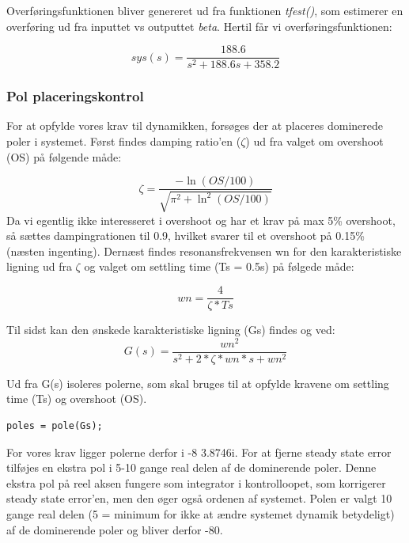 Overføringsfunktionen bliver genereret ud fra funktionen \textit{tfest()}, som estimerer en overføring ud fra inputtet vs outputtet \textit{beta}. Hertil får vi overføringsfunktionen:

\begin{equation}
sys(s) = \frac{188.6}{s^2 + 188.6 s + 358.2}
\end{equation}
    

\subsubsection{Pol placeringskontrol}
For at opfylde vores krav til dynamikken, forsøges der at placeres dominerede poler i systemet. Først findes damping ratio'en ($ \zeta $) ud fra valget om overshoot (OS) på følgende måde: 

\begin{equation}
\zeta = \frac{-\ln(OS/100)}{\sqrt{\pi^2+\ln^2(OS/100)}}
\end{equation} 
Da vi egentlig ikke interesseret i overshoot og har et krav på max 5\% overshoot, så sættes dampingrationen til 0.9, hvilket svarer til et overshoot på 0.15\% (næsten ingenting).
Dernæst findes resonansfrekvensen wn for den karakteristiske ligning ud fra $ \zeta $ og valget om settling time (Ts = 0.5s) på følgede måde:

\begin{equation}
wn = \frac{4}{\zeta*Ts}
\end{equation} 

Til sidst kan den ønskede karakteristiske ligning (Gs) findes og ved:
\begin{equation}
G(s) = \frac{wn^2}{s^2+2*\zeta*wn*s+wn^2}
\end{equation}

Ud fra G(s) isoleres polerne, som skal bruges til at opfylde kravene om settling time (Ts) og overshoot (OS).
\begin{lstlisting}[frame=single]
poles = pole(Gs);
\end{lstlisting}


For vores krav ligger polerne  derfor i -8 \textpm3.8746i. For at fjerne steady state error tilføjes en ekstra pol i 5-10 gange real delen af de dominerende poler. Denne ekstra pol på reel aksen fungere som integrator i kontrolloopet, som korrigerer steady state error'en, men den øger også ordenen af systemet. Polen er valgt 10 gange real delen (5 = minimum for ikke at ændre systemet dynamik betydeligt) af de dominerende poler og bliver derfor -80.


